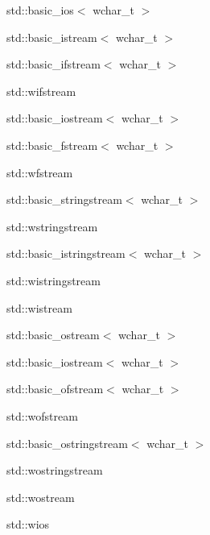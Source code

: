 \begin{CompactList}
\begin{CompactList}
\item std::basic\_\-ios$<$ wchar\_\-t $>$\begin{CompactList}
\item std::basic\_\-istream$<$ wchar\_\-t $>$\begin{CompactList}
\item std::basic\_\-ifstream$<$ wchar\_\-t $>$\begin{CompactList}
\item std::wifstream\end{CompactList}
\item std::basic\_\-iostream$<$ wchar\_\-t $>$\begin{CompactList}
\item std::basic\_\-fstream$<$ wchar\_\-t $>$\begin{CompactList}
\item std::wfstream\end{CompactList}
\item std::basic\_\-stringstream$<$ wchar\_\-t $>$\begin{CompactList}
\item std::wstringstream\end{CompactList}
\end{CompactList}
\item std::basic\_\-istringstream$<$ wchar\_\-t $>$\begin{CompactList}
\item std::wistringstream\end{CompactList}
\item std::wistream\end{CompactList}
\item std::basic\_\-ostream$<$ wchar\_\-t $>$\begin{CompactList}
\item std::basic\_\-iostream$<$ wchar\_\-t $>$\item std::basic\_\-ofstream$<$ wchar\_\-t $>$\begin{CompactList}
\item std::wofstream\end{CompactList}
\item std::basic\_\-ostringstream$<$ wchar\_\-t $>$\begin{CompactList}
\item std::wostringstream\end{CompactList}
\item std::wostream\end{CompactList}
\item std::wios\end{CompactList}

\end{CompactList}
\end{CompactList}
